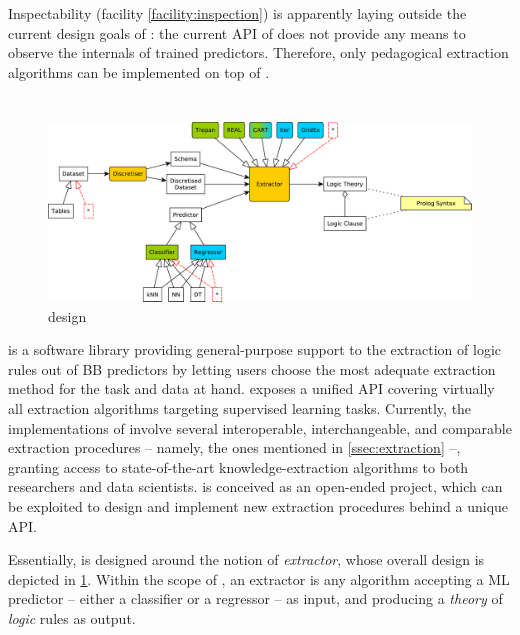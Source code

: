 \documentclass[12pt,a4paper,openright,twoside]{book}
\begin{document}
Inspectability (facility \ref{facility:inspection}) is apparently laying outside the current design goals of \smile{}: the current API of \smile{} does not provide any means to observe the internals of trained predictors.
%
Therefore, only pedagogical extraction algorithms can be implemented on top of \smile{}.

\section{\psyke}\label{sec:psyke}

\begin{figure}
    \centering
    \includegraphics[width=\linewidth]{figures/Psyke.pdf}
    \caption{\psyke{} design}
    \label{fig:psyke-design}
\end{figure}

\psyke{} is a software library providing general-purpose support to the extraction of logic rules out of BB predictors by letting users choose the most adequate extraction method for the task and data at hand.
%
\psyke{} exposes a unified API covering virtually all extraction algorithms targeting supervised learning tasks.
%
Currently, the implementations of \psyke{} involve several interoperable, interchangeable, and comparable extraction procedures -- namely, the ones mentioned in \cref{ssec:extraction} --, granting access to state-of-the-art knowledge-extraction algorithms to both researchers and data scientists.
%
\psyke{} is conceived as an open-ended project, which can be exploited to design and implement new extraction procedures behind a unique API.

Essentially, \psyke{} is designed around the notion of \emph{extractor}, whose overall design is depicted in \cref{fig:psyke-design}.
%
Within the scope of \psyke{}, an extractor is any algorithm accepting a ML predictor -- either a classifier or a regressor -- as input, and producing a \emph{theory} of \emph{logic} rules as output.
\end{document}
